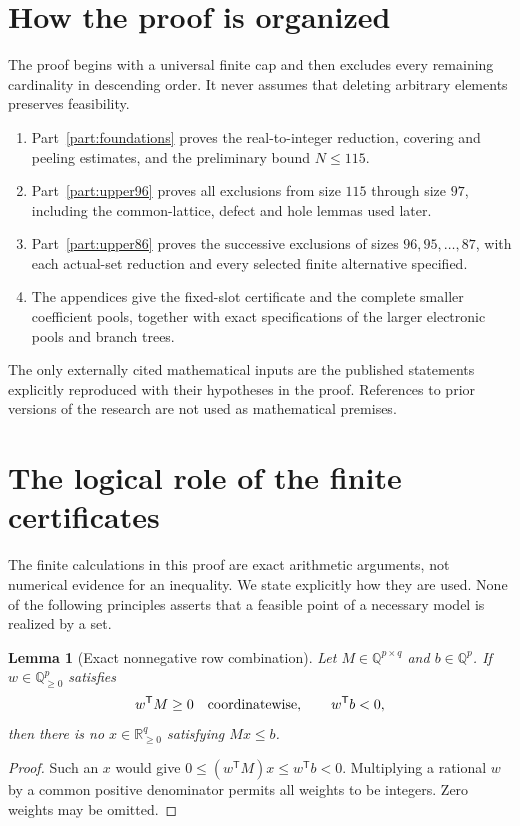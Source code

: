 \documentclass[11pt,a4paper]{article}
\newtheorem{lemma}[theorem]{Lemma}
\theoremstyle{remark}
\begin{document}
\section*{How the proof is organized}
The proof begins with a universal finite cap and then excludes every
remaining cardinality in descending order. It never assumes that deleting
arbitrary elements preserves feasibility.
\begin{enumerate}
\item Part~\ref{part:foundations} proves the real-to-integer reduction,
covering and peeling estimates, and the preliminary bound $N\le115$.
\item Part~\ref{part:upper96} proves all exclusions from size $115$ through
size $97$, including the common-lattice, defect and hole lemmas used later.
\item Part~\ref{part:upper86} proves the successive exclusions of sizes
$96,95,\ldots,87$, with each actual-set reduction and every selected
finite alternative specified.
\item The appendices give the fixed-slot certificate and the complete
smaller coefficient pools, together with exact specifications of the
larger electronic pools and branch trees.
\end{enumerate}
The only externally cited mathematical inputs are the published statements
explicitly reproduced with their hypotheses in the proof. References to
prior versions of the research are not used as mathematical premises.



\section{The logical role of the finite certificates}\label{completion:certificate-principle}
The finite calculations in this proof are exact arithmetic arguments, not
numerical evidence for an inequality. We state explicitly how they are
used. None of the following principles asserts that a feasible point of
a necessary model is realized by a set.

\begin{lemma}[Exact nonnegative row combination]\label{completion:farkas}
Let $M\in\mathbb Q^{p\times q}$ and $b\in\mathbb Q^p$.
If $w\in\mathbb Q_{\ge0}^p$ satisfies
\[
 w^{\mathsf T}M\ge0\quad\hbox{coordinatewise},\qquad
 w^{\mathsf T}b<0,
\]
then there is no $x\in\mathbb R_{\ge0}^q$ satisfying $Mx\le b$.
\end{lemma}
\begin{proof}
Such an $x$ would give
$0\le(w^{\mathsf T}M)x\le w^{\mathsf T}b<0$.
Multiplying a rational $w$ by a common positive denominator permits all
weights to be integers. Zero weights may be omitted.
\end{proof}
\end{document}

